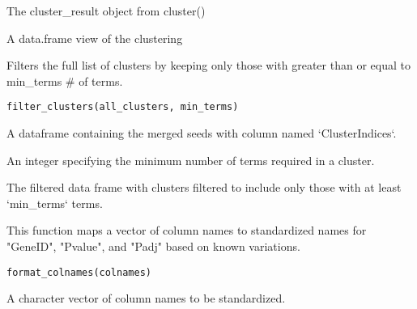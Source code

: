 \documentclass[a4paper]{book}
\begin{document}
%
\begin{Arguments}
\begin{ldescription}
\item[\code{cluster\_result}] The cluster\_result object from cluster()
\end{ldescription}
\end{Arguments}
%
\begin{Value}
A data.frame view of the clustering
\end{Value}
%
\begin{Description}
Filters the full list of clusters by keeping only those with greater
than or equal to min\_terms \# of terms.
\end{Description}
%
\begin{Usage}
\begin{verbatim}
filter_clusters(all_clusters, min_terms)
\end{verbatim}
\end{Usage}
%
\begin{Arguments}
\begin{ldescription}
\item[\code{all\_clusters}] A dataframe containing the merged seeds with column named `ClusterIndices`.

\item[\code{min\_terms}] An integer specifying the minimum number of terms required in a cluster.
\end{ldescription}
\end{Arguments}
%
\begin{Value}
The filtered data frame with clusters filtered to include only those with at least `min\_terms` terms.
\end{Value}
%
\begin{Description}
This function maps a vector of column names to standardized names
for "GeneID", "Pvalue", and "Padj" based on known variations.
\end{Description}
%
\begin{Usage}
\begin{verbatim}
format_colnames(colnames)
\end{verbatim}
\end{Usage}
%
\begin{Arguments}
\begin{ldescription}
\item[\code{colnames}] A character vector of column names to be standardized.
\end{ldescription}
\end{Arguments}
\end{document}
